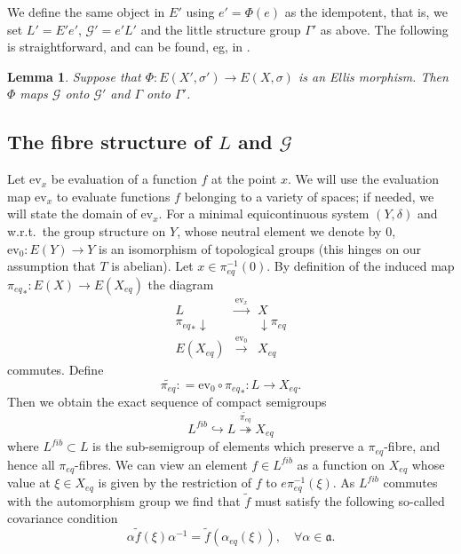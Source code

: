 \documentclass[10pt,a4paper]{amsart}
\newtheorem{lemma}[theorem]{Lemma}
\numberwithin{equation}{section}
\newcommand{\Gg}{{\mathcal G}}
\newcommand{\Xe}{X_{eq}}
\newcommand{\aut}{{\mathfrak a}}
\newcommand{\pe}{\pi_{eq}}
\newcommand{\tpe}{\widetilde{\pe}}
\newcommand{\ev}{\mathrm{ev}}
\newcommand{\peq}{\pi_{eq}}
\begin{document}
We define the same object in $E'$ using $e'=\Phi(e)$ as the idempotent, that is, we set $L'=E'e'$, $\Gg' = e'L'$ and the little structure group $\Gamma'$ as above. The following is straightforward, and can be found, eg, in \cite[Lemma 24]{BKY}.  
\begin{lemma}
Suppose  that $\Phi:E(X',\sigma')\rightarrow E(X,\sigma)$ is an Ellis morphism. Then 
$\Phi$ maps  $\Gg$ onto $\Gg'$ and $\Gamma$ onto $\Gamma'$.
\end{lemma}


\subsection{The fibre structure of $L$ and $\Gg$}\label{sec-2.4}

Let $\ev_x$ be evaluation of a function $f$ at the point $x$. We will use  the evaluation  map $\ev_x$ to evaluate  functions $f$  belonging to a variety of spaces; if needed, we will state the domain of $\ev_x$.
For a minimal equicontinuous system  $(Y,\delta)$ and w.r.t.\ the group structure on $Y$, whose neutral element we denote by $0$,
$\ev_{0} : E(Y) \to Y$ is an isomorphism of topological groups  \cite[Chap.~3, Theorem~6]{Auslander1988} (this hinges on our assumption that $T$ is abelian).
Let $x\in\pe^{-1}(0)$. By definition of the induced map ${\pe}_*:E(X)\to E(\Xe)$ the diagram
\begin{equation}\label{eq-commuting1}
\begin{matrix}
L & \stackrel{\ev_x}\to & X \\
{\pe}_* \downarrow & & \downarrow \pe \\
E(\Xe)  &\stackrel{\ev_0} \to & \Xe 
\end{matrix}
\end{equation}
commutes. Define
$$\tpe : = \ev_0\circ {\pe}_*:L\to \Xe.$$
Then we obtain the exact sequence of compact semigroups
$$L^{fib} \hookrightarrow L \stackrel{\tpe}\twoheadrightarrow \Xe$$
where $L^{fib}\subset L$ is the sub-semigroup of elements  
which preserve a $\peq$-fibre, and hence all $\peq$-fibres.
We can view an element $f\in L^{fib}$ as a function on $\Xe$ 
whose value at $\xi\in \Xe$ is given by the restriction of $f$ to  $e\pe^{-1}(\xi)$. As $L^{fib}$ commutes with the automorphism group we find that $\tilde f$ must satisfy the following so-called covariance condition
\begin{equation}\label{eq-cov-0}
\alpha \tilde f(\xi) \alpha^{-1} = \tilde f(\alpha_{eq}(\xi)),\quad \forall \alpha\in \aut.
\end{equation}
\end{document}
